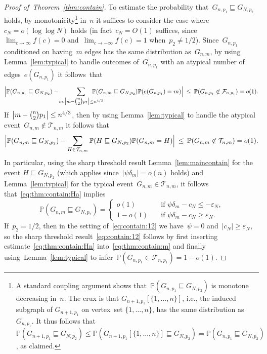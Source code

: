 \documentclass{article}
\newcommand{\eps}{\varepsilon}
\renewcommand{\Pr}{\mathbb{P}}
\newcommand{\cF}{\mathcal{F}}
\newcommand{\cT}{\mathcal{T}}
\newcommand\abs[1]{\left|#1\right|}
\newcommand{\isub}{\sqsubseteq}
\newcommand\bigabs[1]{\bigl|#1\bigr|}
\newcommand\Bigabs[1]{\Bigl|#1\Bigr|}
\newcommand{\refT}[1]{Theorem~\ref{#1}}
\newcommand{\refL}[1]{Lemma~\ref{#1}}
\begin{document}
\begin{proof}[Proof of~\refT{thm:contain}]
To estimate the probability that~$G_{n,p_1} \isub G_{N,p_2}$ holds, 
by monotonicity\footnote{A standard coupling argument shows that~${\Pr(G_{n,p_1} \isub G_{N,p_2})}$ is monotone decreasing in~$n$. 
The crux is that ${G_{n+1,p_1}[\{1, \ldots, n\}]}$, i.e., the induced subgraph of $G_{n+1,p_1}$ on vertex~set ${\{1,\ldots, n\}}$, has the same distribution as~$G_{n,p_1}$.
It thus follows that $\Pr(G_{n+1,p_1} \isub G_{N,p_2}) \le \Pr({G_{n+1,p_1}[\{1, \ldots, n\}]} \isub G_{N,p_2}) = \Pr(G_{n,p_1} \isub G_{N,p_2})$, as claimed.} 
in~$n$ it suffices to consider the case where~$c_N = o(\log \log N)$ holds 
(in fact~$c_N=O(1)$ suffices, since~$\lim_{c \to \infty}f(c)=0$ and~$\lim_{c \to -\infty}f(c)=1$ when~$p_2 \neq 1/2$). 
Since~$G_{n,p_1}$ conditioned on having~$m$ edges has the same distribution as~$G_{n,m}$, by using \refL{lem:typical} to handle outcomes of~$G_{n,p_1}$ with an atypical number of edges~$e(G_{n,p_1})$ it follows~that
\begin{equation}\label{eq:thm:contain:m}
\begin{split}
\Bigabs{\Pr(G_{n,p_1} \isub G_{N,p_2}) - \! \sum_{m:\bigabs{m-\tbinom{n}{2}p_1} \le n^{4/3}} \!\!\!\!\!\!\!\!\!\!\!\! \Pr(G_{n,m} \isub G_{N,p_2}) \Pr(e(G_{n,p_1})=m)} 
 \: \le \: \Pr(G_{n,p_1} \not\in \cF_{n,p_1})=o(1) . 
\end{split}
\end{equation}
If~$\bigabs{m-\tbinom{n}{2}p_1} \le n^{4/3}$, 
then by using \refL{lem:typical} to handle the atypical event~$G_{n,m} \not\in \cT_{n,m}$ it follows that 
\begin{equation}\label{eq:thm:contain:Ha}
\begin{split}
\Bigabs{\Pr(G_{n,m} \isub G_{N,p_2}) -  \sum_{H \in \cT_{n,m}} \Pr(H \isub G_{N,p_2}) \Pr(G_{n,m}=H)} 
 \: \le \: \Pr(G_{n,m} \not\in \cT_{n,m}) = o(1) . 
\end{split}
\end{equation}
In particular, using the sharp threshold result \refL{lem:maincontain} for the event $H \isub G_{N,p_2}$ (which applies since~$|\psi \delta_m| =o(n)$ holds)
and \refL{lem:typical} for the typical event~$G_{n,m} \in \cT_{n,m}$, 
it follows that~\eqref{eq:thm:contain:Ha} implies 
\begin{equation}\label{eq:thm:contain:Hn}
\Pr(G_{n,m} \isub G_{N,p_2}) 
= \begin{cases} o(1) \quad & \text{if~$\psi \delta_m-c_N \le -\eps_N$,}\\ 
1-o(1) \quad & \text{if~$\psi \delta_m-c_N \ge \eps_N$.}\end{cases}
\end{equation}
If~$p_2=1/2$, 
then in the setting of~\eqref{eq:contain:12} we have~$\psi=0$ and~$\abs{c_N} \geq \eps_N$, so the sharp threshold result~\eqref{eq:contain:12}  follows by first inserting estimate~\eqref{eq:thm:contain:Hn} into~\eqref{eq:thm:contain:m} 
and finally using~\refL{lem:typical} to infer~$\Pr(G_{n,p_1} \in \cF_{n,p_1})=1-o(1)$. 


\end{proof}
\end{document}
